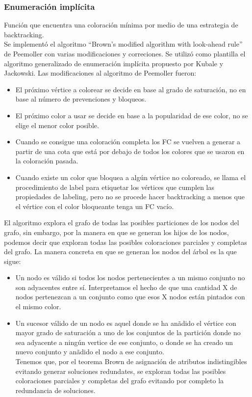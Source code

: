 \documentclass[a4paper,10pt]{article}
\begin{document}
\subsubsection{Enumeraci\'on impl\'icita}
Funci\'on que encuentra una coloraci\'on m\'inima por medio de una
estrategia de backtracking.\\

\indent Se implement\'o el algoritmo ``Brown's modified algorithm with
look-ahead rule'' de Peemoller con varias modificaciones y
correciones. Se utiliz\'o como plantilla el algoritmo generalizado de
enumeraci\'on impl\'icita propuesto por Kubale y Jackowski. Las
modificaciones al algoritmo de Peemoller fueron:
\begin{itemize}
\item El pr\'oximo v\'ertice a colorear se decide en base al grado de
      saturaci\'on, no en base al n\'umero de prevenciones y bloqueos.
\item El pr\'oximo color a usar se decide en base a la popularidad de
      ese color, no se elige el menor color posible.
\item Cuando se consigue una coloración completa los FC se vuelven a generar 
	a partir de una cota que está por debajo de todos los colores que se 
	usaron en la coloración pasada.
\item Cuando existe un color que bloquea a algún vértice no coloreado, se llama
	el procedimiento de label para etiquetar los vértices que cumplen las 
	propiedades de labeling, pero no se procede hacer backtracking a menos 
	que el vértice con el color bloqueante tenga un FC vacío.
\end{itemize}

\indent El algoritmo explora el grafo de todas las posibles particiones
de los nodos del grafo, sin embargo, por la manera en que se generan los
hijos de los nodos, podemos decir que exploran todas las posibles
coloraciones parciales y completas del grafo. La manera concreta en que
se generan los nodos del \'arbol es la que sigue:
\begin{itemize}
 \item Un nodo es v\'alido si todos los nodos
       pertenecientes a un mismo conjunto no son adyacentes entre
       s\'i. Interpretamos el hecho de que una cantidad X de
       nodos pertenezcan a un conjunto como que esos X nodos
       est\'an pintados con el mismo color.
 \item Un sucesor v\'alido de un nodo es aquel donde se ha an\~adido el
       v\'ertice con mayor grado de saturaci\'on a uno de los conjuntos de la
       partici\'on donde no sea adyacente a ning\'un vertice de ese
       conjunto, o donde se ha creado un nuevo conjunto y an\~adido el
       nodo a ese conjunto.\\
       \indent Tenemos que, por el teorema Brown de asignaci\'on de atributos
       indistingibles evitando generar soluciones redundates, se
       exploran todas las posibles coloraciones parciales y completas
       del grafo evitando por completo la redundancia de soluciones.
\end{itemize}
\end{document}
